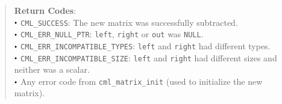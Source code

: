 \documentclass[a4paper,oneside,8pt]{extarticle}
\renewcommand{\dot}{\raisebox{0.3ex}{\scalebox{0.6}{$\bullet$}}}
\theoremstyle{definition}
\begin{document}
\begin{quote}
  \vspace{-0.75em}
  \textbf{Return Codes}: \\
  $\dot$ \texttt{CML\_SUCCESS}: The new matrix was successfully subtracted. \\
  $\dot$ \texttt{CML\_ERR\_NULL\_PTR}: \texttt{left}, \texttt{right} or \texttt{out} was \texttt{NULL}. \\
  $\dot$ \texttt{CML\_ERR\_INCOMPATIBLE\_TYPES}: \texttt{left} and \texttt{right} had different types. \\
  $\dot$ \texttt{CML\_ERR\_INCOMPATIBLE\_SIZE}: \texttt{left} and \texttt{right} had different sizes and neither was a scalar. \\
  $\dot$ Any error code from \texttt{cml\_matrix\_init} (used to initialize the new matrix). \\
\end{quote}
\end{document}

